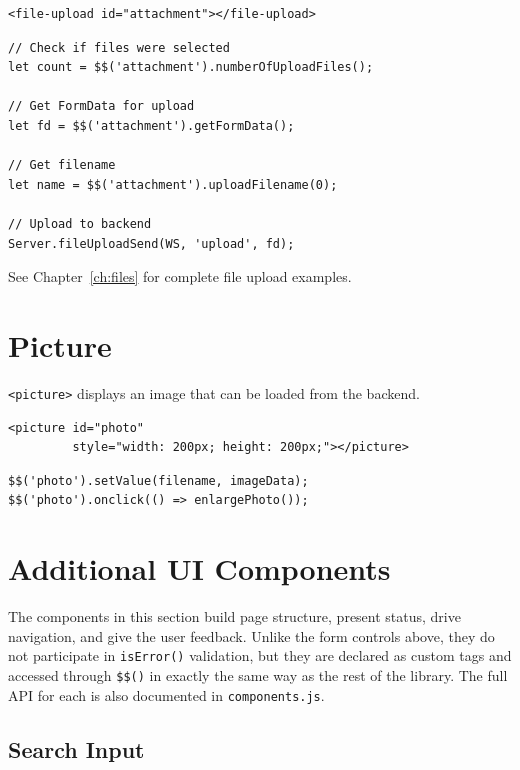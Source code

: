\begin{lstlisting}[style=html]
<file-upload id="attachment"></file-upload>
\end{lstlisting}

\begin{lstlisting}[style=javascript]
// Check if files were selected
let count = $$('attachment').numberOfUploadFiles();

// Get FormData for upload
let fd = $$('attachment').getFormData();

// Get filename
let name = $$('attachment').uploadFilename(0);

// Upload to backend
Server.fileUploadSend(WS, 'upload', fd);
\end{lstlisting}

\noindent
See Chapter~\ref{ch:files} for complete file upload examples.

\section{Picture}
\label{sec:comp-picture}

\texttt{<picture>} displays an image that can be loaded from the backend.

\begin{lstlisting}[style=html]
<picture id="photo"
         style="width: 200px; height: 200px;"></picture>
\end{lstlisting}

\begin{lstlisting}[style=javascript]
$$('photo').setValue(filename, imageData);
$$('photo').onclick(() => enlargePhoto());
\end{lstlisting}

\section{Additional UI Components}
\label{sec:comp-additional}

The components in this section build page structure, present status, drive navigation, and give the user feedback.  Unlike the form controls above, they do not participate in \texttt{isError()} validation, but they are declared as custom tags and accessed through \texttt{\$\$()} in exactly the same way as the rest of the library.  The full API for each is also documented in \texttt{components.js}.

\subsection{Search Input}
\label{sec:comp-search-input}

